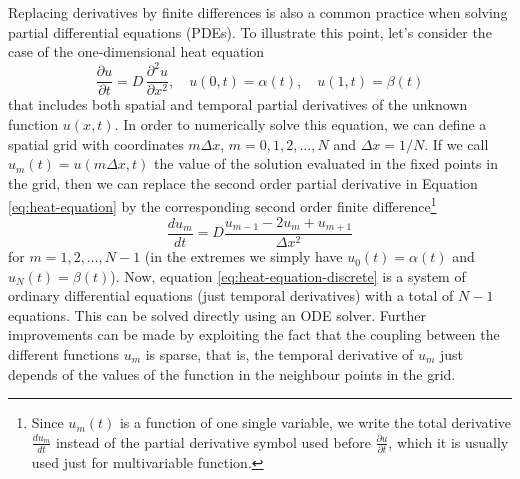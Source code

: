 Replacing derivatives by finite differences is also a common practice when solving partial differential equations (PDEs). 
To illustrate this point, let's consider the case of the one-dimensional heat equation 
\begin{equation}
    \frac{\partial u}{\partial t}
    = 
    D \, 
    \frac{\partial^2 u}{\partial x^2}, 
    \quad u(0, t) = \alpha(t), 
    \quad u(1, t) = \beta(t)
    \label{eq:heat-equation}
\end{equation}
that includes both spatial and temporal partial derivatives of the unknown function $u(x, t)$. 
In order to numerically solve this equation, we can define a spatial grid with coordinates $m \Delta x$, $m=0, 1, 2, \ldots, N$ and $\Delta x = 1 / N$. 
If we call $u_m(t) = u(m \Delta x, t)$ the value of the solution evaluated in the fixed points in the grid, then we can replace the second order partial derivative in Equation \eqref{eq:heat-equation} by the corresponding second order finite difference\footnote{Since $u_m(t)$ is a function of one single variable, we write the total derivative $\frac{du_m}{dt}$ instead of the partial derivative symbol used before $\frac{\partial u}{\partial t}$, which it is usually used just for multivariable function.}
\begin{equation}
    \frac{d u_m}{dt} 
    = 
    D 
    \frac{u_{m-1} - 2u_m + u_{m+1}}{\Delta x^2}
    \label{eq:heat-equation-discrete}
\end{equation}
for $m = 1, 2, \ldots, N-1$ (in the extremes we simply have $u_0(t) = \alpha(t)$ and $u_N(t)=\beta(t)$). 
Now, equation \eqref{eq:heat-equation-discrete} is a system of ordinary differential equations (just temporal derivatives) with a total of $N-1$ equations. 
This can be solved directly using an ODE solver.
Further improvements can be made by exploiting the fact that the coupling between the different functions $u_m$ is sparse, that is, the temporal derivative of $u_m$ just depends of the values of the function in the neighbour points in the grid. 
